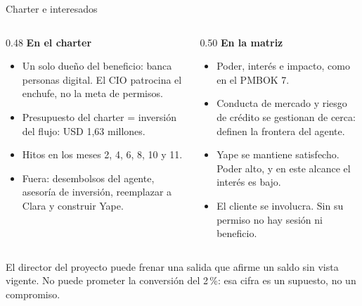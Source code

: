 \documentclass[aspectratio=169,11pt]{beamer}
\begin{document}
\begin{frame}{Charter e interesados}
\vspace{0.05cm}
\begin{columns}[T]
\begin{column}{0.48\textwidth}
{\color{cobre}\bfseries En el charter}
\begin{itemize}
\setlength{\itemsep}{0.14em}
  \item Un solo dueño del beneficio: banca personas digital. El CIO patrocina el enchufe, no la meta de permisos.
  \item Presupuesto del charter = inversión del flujo: USD 1{,}63 millones.
  \item Hitos en los meses 2, 4, 6, 8, 10 y 11.
  \item Fuera: desembolsos del agente, asesoría de inversión, reemplazar a Clara y construir Yape.
\end{itemize}
\end{column}
\begin{column}{0.50\textwidth}
{\color{bcp}\bfseries En la matriz}
\begin{itemize}
\setlength{\itemsep}{0.14em}
  \item Poder, interés e impacto, como en el PMBOK 7.
  \item Conducta de mercado y riesgo de crédito se gestionan de cerca: definen la frontera del agente.
  \item Yape se mantiene satisfecho. Poder alto, y en este alcance el interés es bajo.
  \item El cliente se involucra. Sin su permiso no hay sesión ni beneficio.
\end{itemize}
\end{column}
\end{columns}
\vspace{0.28cm}
{\small El director del proyecto puede frenar una salida que afirme un saldo sin vista vigente. No puede prometer la conversión del 2\,\%: esa cifra es un supuesto, no un compromiso.}
\end{frame}
\end{document}
